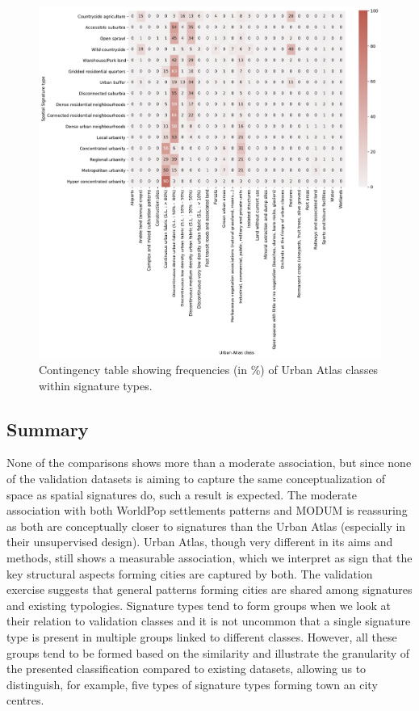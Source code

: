 \begin{figure}
    \centering
    \includegraphics[width=\linewidth]{fig/crosstab_ua.pdf}
    \caption{Contingency table showing frequencies (in \%) of Urban Atlas classes within signature types.}
    \label{fig:crosstab_ua}
\end{figure}

\subsection*{Summary}
None of the comparisons shows more than a moderate association, but since none of the
validation datasets is aiming to capture the same conceptualization of space as spatial
signatures do, such a result is expected. The moderate association with both WorldPop
settlements patterns and MODUM is reassuring as both are conceptually closer to
signatures than the Urban Atlas (especially in their unsupervised design). Urban Atlas,
though very different in its aims and methods, still shows a measurable association,
which we interpret as sign that the key structural aspects forming cities are captured by both. The
validation exercise suggests that general patterns forming cities are shared among
signatures and existing typologies. Signature types tend to form groups when we look at
their relation to validation classes and it is not uncommon that a single signature type
is present in multiple groups linked to different classes. However, all these groups
tend to be formed based on the similarity and illustrate the granularity of the
presented classification compared to existing datasets, allowing us to distinguish, for
example, five types of signature types forming town an city centres.

